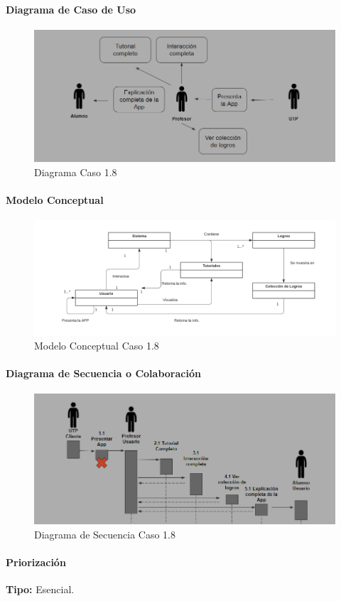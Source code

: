 \paragraph{Diagrama de Caso de Uso}

\begin{figure}[H]
\centerline{\includegraphics[width=15cm]{imgs/CasoUso_8.PNG}}
\caption{Diagrama Caso 1.8}
\label{fig_8_1}
\end{figure}

\paragraph{Modelo Conceptual}

\begin{figure}[H]
\centerline{\includegraphics[width=15cm]{imgs/ModeloConceptualCaso_8_3.png}}
\caption{Modelo Conceptual Caso 1.8}
\label{fig_8_2}
\end{figure}

\paragraph{Diagrama de Secuencia o Colaboración}

\begin{figure}[H]
\centerline{\includegraphics[width=15cm]{imgs/CasoUso_8_2.PNG}}
\caption{Diagrama de Secuencia Caso 1.8}
\label{fig_8_3}
\end{figure}

\paragraph{Priorización}
{\textbf {Tipo:}}
Esencial.